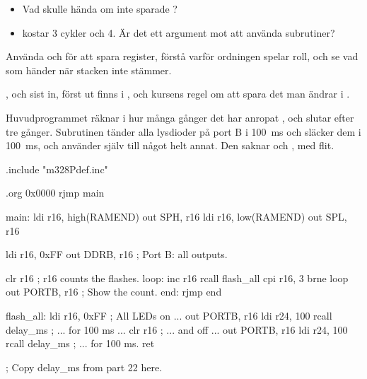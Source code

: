 \begin{itemize}
  \item Vad skulle hända om  inte sparade ?
  \item {} kostar 3 cykler och  4. Är det ett argument mot att använda
    subrutiner?
\end{itemize}


\label{lab3:d23}
Använda  och  för att spara register, förstå varför ordningen spelar roll, och
se vad som händer när stacken inte stämmer.

,  och sist in, först ut finns i , och kursens regel om att
spara det man ändrar i .

Huvudprogrammet räknar i  hur många gånger det har anropat , och slutar
efter tre gånger. Subrutinen  tänder alla lysdioder på port B i 100~ms och släcker
dem i 100~ms, och använder själv  till något helt annat. Den saknar  och
, med flit.

\begin{asmcode}
.include "m328Pdef.inc"

.org 0x0000
    rjmp main

main:
    ldi r16, high(RAMEND)
    out SPH, r16
    ldi r16, low(RAMEND)
    out SPL, r16

    ldi r16, 0xFF
    out DDRB, r16                   ; Port B: all outputs.

    clr r16                         ; r16 counts the flashes.
loop:
    inc r16
    rcall flash_all
    cpi r16, 3
    brne loop
    out PORTB, r16                  ; Show the count.
end:
    rjmp end

flash_all:
    ldi r16, 0xFF                   ; All LEDs on ...
    out PORTB, r16
    ldi r24, 100
    rcall delay_ms                  ; ... for 100 ms ...
    clr r16                         ; ... and off ...
    out PORTB, r16
    ldi r24, 100
    rcall delay_ms                  ; ... for 100 ms.
    ret

; Copy delay_ms from part 22 here.
\end{asmcode}

